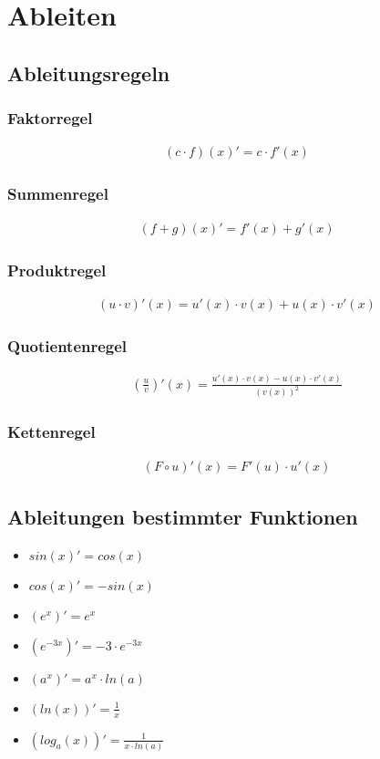 \section{Ableiten}
\subsection{Ableitungsregeln}
\subsubsection{Faktorregel}
\begin{align*}
    (c \cdot f)(x)' = c \cdot f'(x)
\end{align*}
\subsubsection{Summenregel}
\begin{align*}
    (f+ g)(x)' = f'(x) + g'(x)
\end{align*}
\subsubsection{Produktregel}
\begin{align*}
    (u \cdot v)'(x) = u'(x) \cdot v(x) + u(x) \cdot v'(x)
\end{align*}
\subsubsection{Quotientenregel}
\begin{align*}
    \left(\frac{u}{v}\right)'(x) = \frac{u'(x) \cdot v(x) - u(x) \cdot v'(x)}{(v(x))^2}
\end{align*}
\subsubsection{Kettenregel}
\begin{align*}
    (F \circ u)'(x) = F'(u) \cdot u'(x)
\end{align*}
\subsection{Ableitungen bestimmter Funktionen}
\begin{itemize}
    \item $sin(x)' = cos(x)$
    \item $cos(x)' = -sin(x)$
    \item $(e^x)' = e^x$
    \item $(e^{-3x})' = -3 \cdot e^{-3x}$
    \item $(a^x)' = a^x \cdot ln(a)$
    \item $(ln(x))' = \frac{1}{x}$
    \item $(log_a(x))' = \frac{1}{x \cdot ln(a)}$
\end{itemize}
